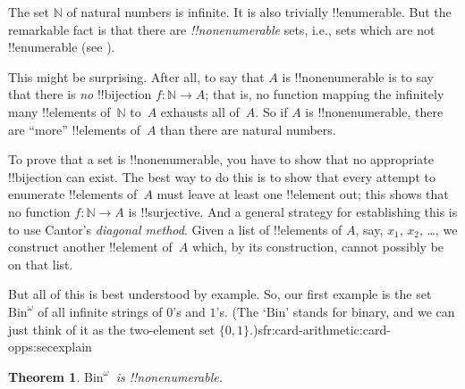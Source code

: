 \documentclass[10pt,a4paper]{article}
\makeatletter
\theoremstyle{plain}
\newtheorem{thm}{Theorem}[section]
\theoremstyle{definition}
\theoremstyle{remark}
\newenvironment{explain}{}{}
\newcommand*{\ollabel}[1]{\label{#1}}
\newcommand{\olref}{\@ifnextchar[{\olref@i}{\olref@final}}
\def\olref@i[#1]{\@ifnextchar[{\olref@ii}{\olref@final}}
\def\olref@ii[#1]{\@ifnextchar[{\olref@iii}{\olref@final}}
\def\olref@iii[#1]{\olref@final}
\def\olref@final#1{\ref{#1}}
\providecommand{\Nat}{\ensuremath{\mathbb{N}}}
\providecommand{\funfromto}[3]{#1\colon #2 \to #3}
\providecommand{\Bin}{\mathrm{Bin}}
\providecommand{\oliflabeldef}[3]{#1}
\providecommand{\oliflabeldef}[2]{#1}
\makeatother
\begin{document}
\begin{explain}
The set $\Nat$ of natural numbers is infinite. It is also trivially
!!{enumerable}. But the remarkable fact is that there are
\emph{!!{nonenumerable}} sets, i.e., sets which are not !!{enumerable}
(see \olref[sfr][siz][enm-alt]{defn:enumerable}).

This might be surprising. After all, to say that $A$ is
!!{nonenumerable} is to say that there is \emph{no} !!{bijection} $f
\colon \Nat \to A$; that is, no function mapping the infinitely many
!!{element}s of~$\Nat$ to~$A$ exhausts all of~$A$.  So if $A$ is
!!{nonenumerable}, there are ``more'' !!{element}s of~$A$ than there
are natural numbers.

To prove that a set is !!{nonenumerable}, you have to show that no
appropriate !!{bijection} can exist. The best way to do this is to
show that every attempt to enumerate !!{element}s of~$A$ must leave at
least one !!{element} out; this shows that no function $f\colon \Nat
\to A$ is !!{surjective}. And a general strategy for establishing this
is to use Cantor's \emph{diagonal method}. Given a list of
!!{element}s of $A$, say, $x_1$, $x_2$, \dots, we construct another
!!{element} of~$A$ which, by its construction, cannot possibly be on
that list.

But all of this is best understood by example. So, our first example
is the set~$\Bin^\omega$ of all infinite strings of $0$'s and $1$'s.
(The `$\Bin$' stands for binary, and we can just think of it as the
two-element set
$\{0,1\}$.)\oliflabeldef{sfr:card-arithmetic:card-opps:sec}{\footnote{More
accurately, we should stipulate that $\Bin^\omega$ is the set of all
$\omega$-sequences of $0$'s and $1$s, i.e., the set
$\funfromto{\omega}{\{0,1\}}$. But the meaning of this will only
become clear in \olref[sfr][card-arithmetic][card-opps]{sec}.}{} This
slightly loose formulation should not cause any confusions
for now, however.}
\end{explain}

\begin{thm}
\ollabel{thm:nonenum-bin-omega}
$\Bin^\omega$~is !!{nonenumerable}.
\end{thm}
\end{document}
